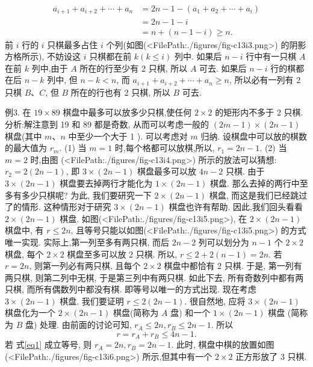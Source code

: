 $$
\begin{aligned}
a_{i+1}+a_{i+2}+\cdots+a_n & =2 n-1-\left(a_1+a_2+\cdots+a_i\right) \\
& =2 n-1-i \\
& =n+(n-1-i) \geqslant n .
\end{aligned}
$$
前 $i$ 行的 $i$ 只棋最多占住 $i$ 个列(如图(<FilePath:./figures/fig-c13i3.png>) 的阴影方格所示), 不妨设这 $i$ 只棋都在前 $k(k \leqslant i)$ 列中.
如果后 $n-i$ 行中有一只棋 $A$ 在前 $k$ 列中,由于 $A$ 所在的行至少有 2 只棋, 所以 $A$ 可去.
如果后 $n-i$ 行的棋都在后 $n-k$ 列中, 但 $n-k<n$, 而 $a_{i+1}+a_{i+2}+\cdots+ a_n \geqslant n$, 所以必有一列有 2 只棋 $B 、 C$, 但 $B$ 所在的行也有 2 只棋, 所以 $B$ 可去.



例3. 在 $19 \times 89$ 棋盘中最多可以放多少只棋,使任何 $2 \times 2$ 的矩形内不多于 2 只棋.
分析:解注意到 19 和 89 都是奇数, 从而可以考虑一般的 $(2 m-1) \times (2 n-1)$ 棋盘(其中 $m 、 n$ 中至少一个大于 1 ). 可以考虑对 $m$ 归纳.
设棋盘中可以放的棋数的最大值为 $r_m$.
(1) 当 $m=1$ 时,每个格都可以放棋,所以, $r_1=2 n-1$.
(2) 当 $m=2$ 时,由图 (<FilePath:./figures/fig-c13i4.png>) 所示的放法可以猜想: $r_2=2(2 n-1)$, 即 $3 \times(2 n-1)$ 棋盘最多可以放 $4 n-2$ 只棋.
由于 $3 \times(2 n-1)$ 棋盘要去掉两行才能化为 $1 \times(2 n-1)$ 棋盘.
那么去掉的两行中至多有多少只棋呢? 为此, 我们要研究一下 $2 \times(2 n-1)$ 棋盘, 而这是我们已经跳过了的情形.
这种情形对于研究 $3 \times(2 n-1)$ 棋盘也许有帮助.
因此,我们回头看看 $2 \times(2 n-1)$ 棋盘.
如图(<FilePath:./figures/fig-c13i5.png>), 在 $2 \times(2 n-1)$ 棋盘中, 有 $r \leqslant 2 n$, 且等号只能以如图(<FilePath:./figures/fig-c13i5.png>) 的方式唯一实现.
实际上,第一列至多有两只棋, 而后 $2 n-2$ 列可以划分为 $n-1$ 个 $2 \times 2$ 棋盘, 每个 $2 \times 2$ 棋盘至多可以放 2 只棋.
所以, $r \leqslant 2+2(n-1)=2 n$. 若 $r=2 n$, 则第一列必有两只棋, 且每个 $2 \times 2$ 棋盘中都恰有 2 只棋.
于是, 第一列有两只棋, 则第二列中无棋, 于是第三列中有两只棋.
如此下去, 所有奇数列中都有两只棋, 而所有偶数列中都没有棋.
即等号以唯一的方式出现.
现在考虑 $3 \times(2 n-1)$ 棋盘.
我们要证明 $r \leqslant 2(2 n-1)$. 很自然地, 应将 $3 \times (2 n-1)$ 棋盘化为一个 $2 \times(2 n-1)$ 棋盘(简称为 $A$ 盘) 和一个 $1 \times(2 n-1)$ 棋盘 (简称为 $B$ 盘) 处理.
由前面的讨论可知, $r_A \leqslant 2 n, r_B \leqslant 2 n-1$. 所以
$$
r=r_A+r_B \leqslant 4 n-1 . \label{eq1}
$$
若 式\ref{eq1} 成立等号, 则 $r_A=2 n, r_B=2 n-1$. 此时, 棋盘中棋的放置如图(<FilePath:./figures/fig-c13i6.png>) 所示,但其中有一个 $2 \times 2$ 正方形放了 3 只棋.
